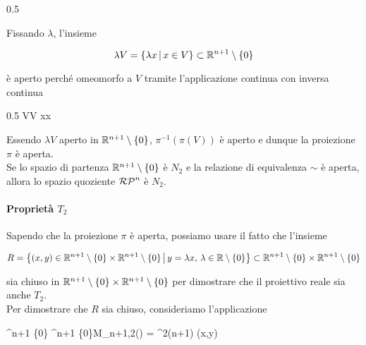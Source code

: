 	{0.5}{%
			}




Fissando $ \lambda $, l'insieme

\begin{equation}
	\lambda V = \left\{ \lambda x \, \middle| \, x \in V \right\} \subset \mathbb{R}^{n+1} \setminus \{0\}
\end{equation}

è aperto perché omeomorfo a $ V $ tramite l'applicazione continua con inversa continua

	{0.5}{%
				{\lambda V}{V}
				{\lambda x}{x}
			}

Essendo $ \lambda V $ aperto in $ \mathbb{R}^{n+1} \setminus \{0\} $, $ \pi^{-1}(\pi(V)) $ è aperto e dunque la proiezione $ \pi $ è aperta.\\
Se lo spazio di partenza $ \mathbb{R}^{n+1} \setminus \{0\} $ è $ N_{2} $ e la relazione di equivalenza $ \sim $ è aperta, allora lo spazio quoziente $ \mathcal{RP}^{n} $ è $ N_{2} $.

\paragraph{Proprietà $ T_{2} $}

Sapendo che la proiezione $ \pi $ è aperta, possiamo usare il fatto che l'insieme

\begin{equation}
	R = \left\{ (x,y) \in \mathbb{R}^{n+1} \setminus \{0\} \times \mathbb{R}^{n+1} \setminus \{0\} \, \middle| \, y=\lambda x, \, \lambda \in \mathbb{R} \setminus \{0\} \right\} \subset \mathbb{R}^{n+1} \setminus \{0\} \times \mathbb{R}^{n+1} \setminus \{0\}
\end{equation}

sia chiuso in $ \mathbb{R}^{n+1} \setminus \{0\} \times \mathbb{R}^{n+1} \setminus \{0\} $ per dimostrare che il proiettivo reale sia anche $ T_{2} $.\\
Per dimostrare che $ R $ sia chiuso, consideriamo l'applicazione

\map{\phi}
	{\R^{n+1} \setminus \{0\} \times \R^{n+1} \setminus \{0\}}{M_{n+1,2}(\R) = \R^{2(n+1)}}
	{(x,y)}{}

